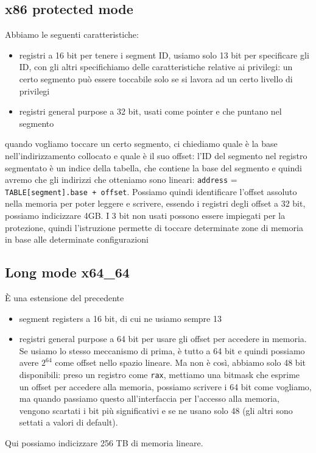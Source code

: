 \documentclass[12pt, oneside]{extbook}
\begin{document}
\subsection{x86 protected mode}
Abbiamo le seguenti caratteristiche:
\begin{itemize}
\item registri a 16 bit per tenere i segment ID, usiamo solo 13 bit per specificare gli ID, con gli altri specifichiamo delle caratteristiche relative ai privilegi: un certo segmento può essere toccabile solo se si lavora ad un certo livello di privilegi
\item registri general purpose a 32 bit, usati come pointer e che puntano nel segmento 
\end{itemize}
quando vogliamo toccare un certo segmento, ci chiediamo quale è la base nell'indirizzamento collocato e quale è il suo offset: l'ID del segmento nel registro segmentato è un indice della tabella, che contiene la base del segmento e quindi avremo che gli indirizzi che otteniamo sono lineari: \texttt{address} = \texttt{TABLE[segment].base + offset}. Possiamo quindi identificare l'offset assoluto nella memoria per poter leggere e scrivere, essendo i registri degli offset a 32 bit, possiamo indicizzare 4GB. I 3 bit non usati possono essere impiegati per la protezione, quindi l'istruzione permette di toccare determinate zone di memoria in base alle determinate configurazioni
\subsection{Long mode x64\_64}
È una estensione del precedente
\begin{itemize}
\item segment registers a 16 bit, di cui ne usiamo sempre 13
\item registri general purpose a 64 bit per usare gli offset per accedere in memoria. Se usiamo lo stesso meccanismo di prima, è tutto a 64 bit e quindi possiamo avere $2^{64}$ come offset nello spazio lineare. Ma non è così, abbiamo solo 48 bit disponibili: preso un registro come \texttt{rax}, mettiamo una bitmask che esprime un offset per accedere alla memoria, possiamo scrivere i 64 bit come vogliamo, ma quando passiamo questo all'interfaccia per l'accesso alla memoria, vengono scartati i bit più significativi e se ne usano solo 48 (gli altri sono settati a valori di default).
\end{itemize}
Qui possiamo indicizzare 256 TB di memoria lineare.
\end{document}
